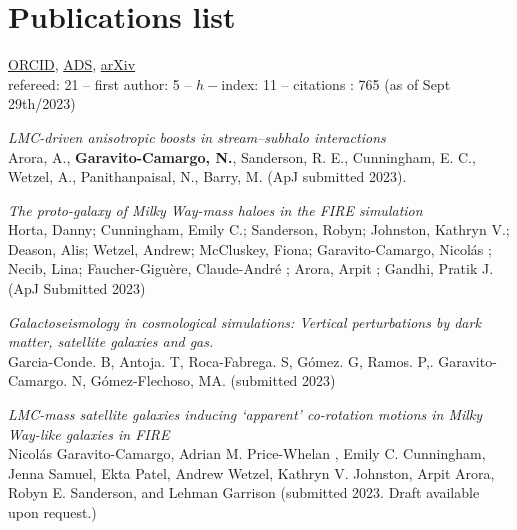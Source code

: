 \documentclass[UTF8]{article}
\begin{document}

\section*{Publications list}



\noindent \href{https://orcid.org/0000-0001-7107-1744}{ORCID},
\href{https://ui.adsabs.harvard.edu/search/q=docs(library%2F0X5_bcuLT4iE-6-Nko0kmg)&sort=date%20desc%2C%20bibcode%20desc&p_=0}{ADS},
\href{https://arxiv.org/search/?query=garavito-camargo&searchtype=all}{arXiv}\\
refereed: 21 -- first author: 5  -- $h-$index: 11 -- citations : 765 (as of Sept 29th/2023) 
\begin{etaremune}
  \setcounter{enumi}{22}


\item \textit{LMC-driven anisotropic boosts in stream–subhalo interactions} \\
  Arora, A., \textbf{Garavito-Camargo, N.}, Sanderson, R. E., Cunningham, E. C., Wetzel, A., Panithanpaisal, N., Barry, M. (ApJ submitted 2023).

\item \textit{The proto-galaxy of Milky Way-mass haloes in the FIRE simulation}
  \\ Horta, Danny; Cunningham, Emily C.; Sanderson, Robyn; Johnston, Kathryn V.;
  Deason, Alis; Wetzel, Andrew; McCluskey, Fiona; Garavito-Camargo, Nicol\'as ; Necib, Lina; Faucher-Giguère, 
  Claude-André ; Arora, Arpit ; Gandhi, Pratik J. (ApJ Submitted 2023)\\

\item \textit{Galactoseismology in cosmological simulations: Vertical
  perturbations by dark matter, satellite galaxies and gas.}\\ Garcia-Conde. B,
  Antoja. T, Roca-Fabrega. S, G\'omez. G, Ramos. P,. Garavito-Camargo. N, G\'omez-Flechoso,
  MA. (submitted 2023)\\ 

\item \textit{LMC-mass satellite galaxies inducing ‘apparent’ co-rotation motions in Milky Way-like galaxies in
FIRE}\\ 
Nicol\'as Garavito-Camargo, Adrian M. Price-Whelan , Emily C. Cunningham, Jenna
Samuel, Ekta Patel, Andrew Wetzel, Kathryn V. Johnston, Arpit Arora, Robyn E.
Sanderson, and Lehman Garrison (submitted 2023. Draft available upon request.) 



\end{etaremune}
\end{document}
